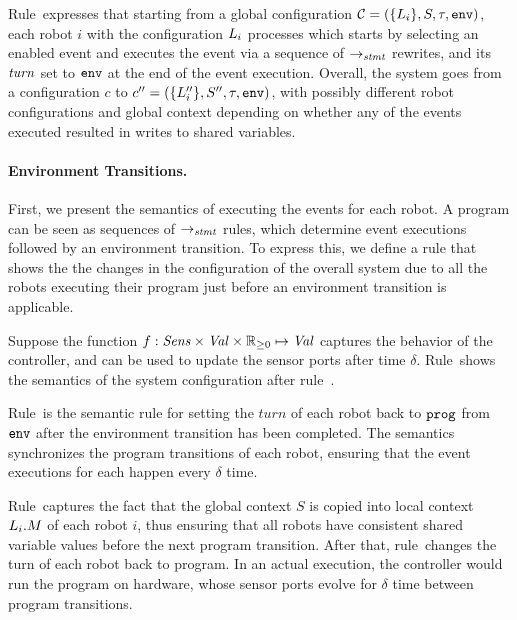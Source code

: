 Rule~\ProgTransRule expresses that starting from a global configuration $\mathcal{C} = (\{L_{i}\}, S, \tau, \mathtt{env})$,
each robot $i$ with the configuration $L_{i}$ processes which starts by selecting an enabled event and executes the event via a sequence of $\rightarrow_\mathit{stmt}$ rewrites,
and its $\mathit{turn}$ set to $\mathtt{env}$ at the end of the event execution.
Overall, the system goes from a configuration $c$ to $c^{\prime\prime}= (\{L_{i}^{\prime\prime}\}, S^{\prime\prime}, \tau, \mathtt{env})$,
with possibly different robot configurations and global context depending on
whether any of the events executed resulted in writes to shared variables.


\paragraph{Environment Transitions.}

First, we present the semantics of executing the events for each robot.
A \lgname program can be seen as sequences of $\rightarrow_\mathit{stmt}$ rules, which determine event executions followed by an environment transition.
To express this, we define a rule that shows the the changes in the configuration of the overall system due to all the robots executing their program just before an environment transition is applicable.


Suppose the function $f:\mathit{Sens} \times \Val \times \nnreals \mapsto \Val$ captures the behavior of the controller,
and can be used to update the sensor ports after time $\delta$.
Rule~\EnvTransRule shows the semantics of the system configuration after rule~\ProgTransRule.


Rule~\RobotEnvToProgRule is the semantic rule for setting the $\mathit{turn}$ of each robot back to $\mathtt{prog}$ from $\mathtt{env}$ after the environment transition has been completed.
The semantics synchronizes the program transitions of each robot, ensuring that the event executions for each happen every $\delta$ time.


Rule~\EnvTransRule captures the fact that the global context $S$ is copied into local context $L_{i}.M$ of each robot $i$,
thus ensuring that all robots have consistent shared variable values before the next program transition.
After that, rule~\EnvToProgRule changes the turn of each robot back to program.
In an actual execution, the controller would run the program on hardware,
whose sensor ports evolve for $\delta$ time between program transitions.

